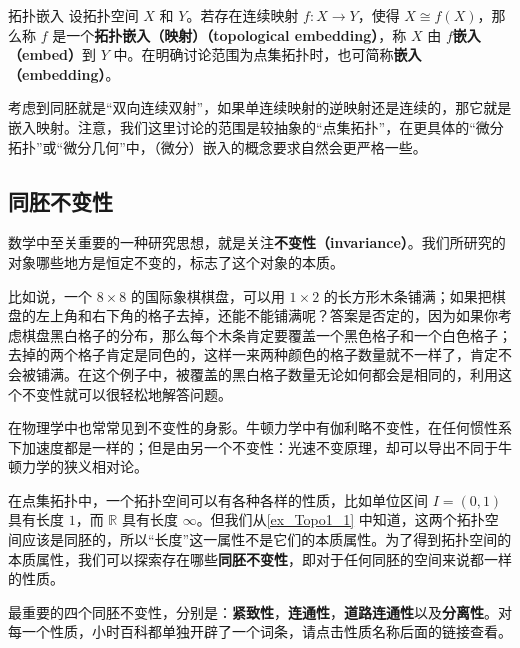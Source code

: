 \begin{definition}{拓扑嵌入}
设拓扑空间 $X$ 和 $Y$。若存在连续映射 $f:X\rightarrow Y$，使得 $X\cong f(X)$，那么称 $f$ 是一个\textbf{拓扑嵌入（映射）（topological embedding）}，称 $X$ 由 $f$\textbf{嵌入（embed）}到 $Y$ 中。在明确讨论范围为点集拓扑时，也可简称\textbf{嵌入（embedding）}。
\end{definition}

考虑到同胚就是“双向连续双射”，如果单连续映射的逆映射还是连续的，那它就是嵌入映射。注意，我们这里讨论的范围是较抽象的“点集拓扑”，在更具体的“微分拓扑”或“微分几何”中，（微分）嵌入的概念要求自然会更严格一些。




\subsection{同胚不变性}

数学中至关重要的一种研究思想，就是关注\textbf{不变性（invariance）}。我们所研究的对象哪些地方是恒定不变的，标志了这个对象的本质。

比如说，一个 $8\times8$ 的国际象棋棋盘，可以用 $1\times2$ 的长方形木条铺满；如果把棋盘的左上角和右下角的格子去掉，还能不能铺满呢？答案是否定的，因为如果你考虑棋盘黑白格子的分布，那么每个木条肯定要覆盖一个黑色格子和一个白色格子；去掉的两个格子肯定是同色的，这样一来两种颜色的格子数量就不一样了，肯定不会被铺满。在这个例子中，被覆盖的黑白格子数量无论如何都会是相同的，利用这个不变性就可以很轻松地解答问题。

在物理学中也常常见到不变性的身影。牛顿力学中有伽利略不变性，在任何惯性系下加速度都是一样的；但是由另一个不变性：光速不变原理，却可以导出不同于牛顿力学的狭义相对论。

在点集拓扑中，一个拓扑空间可以有各种各样的性质，比如单位区间 $I=(0,1)$ 具有长度 $1$，而 $\mathbb{R}$ 具有长度 $\infty$。但我们从\autoref{ex_Topo1_1} 中知道，这两个拓扑空间应该是同胚的，所以“长度”这一属性不是它们的本质属性。为了得到拓扑空间的本质属性，我们可以探索存在哪些\textbf{同胚不变性}，即对于任何同胚的空间来说都一样的性质。

最重要的四个同胚不变性，分别是：\textbf{紧致性}，\textbf{连通性}，\textbf{道路连通性}以及\textbf{分离性}。对每一个性质，小时百科都单独开辟了一个词条，请点击性质名称后面的链接查看。
